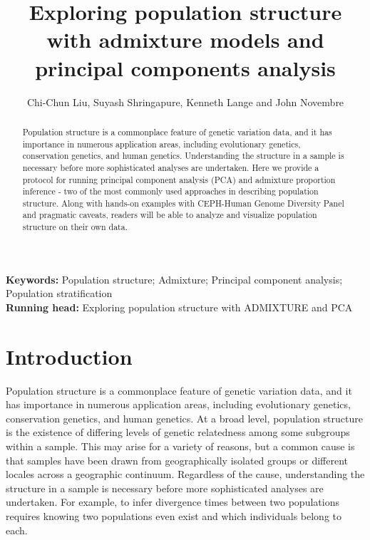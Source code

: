 \documentclass{svmult}       %
\begin{document}
\title{Exploring population structure with admixture models and principal
components analysis }


\author{  Chi-Chun Liu,  Suyash Shringapure,  Kenneth Lange and  John Novembre }




\maketitle
\newpage
\doublespacing

\begin{abstract}
Population structure is a commonplace feature of genetic variation data,
and it has importance in numerous application areas, including
evolutionary genetics, conservation genetics, and human genetics.
Understanding the structure in a sample is necessary before more
sophisticated analyses are undertaken. Here we provide a protocol for
running principal component analysis (PCA) and admixture proportion
inference - two of the most commonly used approaches in describing
population structure. Along with hands-on examples with CEPH-Human
Genome Diversity Panel and pragmatic caveats, readers will be able to
analyze and visualize population structure on their own data.
\end{abstract}


\textbf{Keywords:} Population structure; Admixture; Principal component analysis; Population stratification\\[5mm]

\textbf{Running head:} Exploring population structure with ADMIXTURE and PCA\\

\section{Introduction}\label{introduction}

Population structure is a commonplace feature of genetic variation data,
and it has importance in numerous application areas, including
evolutionary genetics, conservation genetics, and human genetics. At a
broad level, population structure is the existence of differing levels
of genetic relatedness among some subgroups within a sample. This may
arise for a variety of reasons, but a common cause is that samples have
been drawn from geographically isolated groups or different locales
across a geographic continuum. Regardless of the cause, understanding
the structure in a sample is necessary before more sophisticated
analyses are undertaken. For example, to infer divergence times between
two populations requires knowing two populations even exist and which
individuals belong to each.
\end{document}
